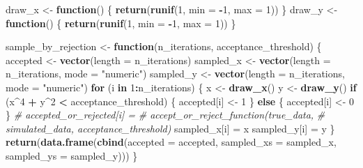 \documentclass[
]{article}
\newenvironment{Shaded}{\begin{snugshade}}{\end{snugshade}}
\newcommand{\AttributeTok}[1]{\textcolor[rgb]{0.13,0.29,0.53}{#1}}
\newcommand{\CommentTok}[1]{\textcolor[rgb]{0.56,0.35,0.01}{\textit{#1}}}
\newcommand{\ControlFlowTok}[1]{\textcolor[rgb]{0.13,0.29,0.53}{\textbf{#1}}}
\newcommand{\DecValTok}[1]{\textcolor[rgb]{0.00,0.00,0.81}{#1}}
\newcommand{\FunctionTok}[1]{\textcolor[rgb]{0.13,0.29,0.53}{\textbf{#1}}}
\newcommand{\NormalTok}[1]{#1}
\newcommand{\OtherTok}[1]{\textcolor[rgb]{0.56,0.35,0.01}{#1}}
\newcommand{\SpecialCharTok}[1]{\textcolor[rgb]{0.81,0.36,0.00}{\textbf{#1}}}
\newcommand{\StringTok}[1]{\textcolor[rgb]{0.31,0.60,0.02}{#1}}
\begin{document}
\begin{Shaded}
\begin{Highlighting}[]
\NormalTok{draw\_x }\OtherTok{\textless{}{-}} \ControlFlowTok{function}\NormalTok{() \{}
    \FunctionTok{return}\NormalTok{(}\FunctionTok{runif}\NormalTok{(}\DecValTok{1}\NormalTok{, }\AttributeTok{min =} \SpecialCharTok{{-}}\DecValTok{1}\NormalTok{, }\AttributeTok{max =} \DecValTok{1}\NormalTok{))}
\NormalTok{\}}
\NormalTok{draw\_y }\OtherTok{\textless{}{-}} \ControlFlowTok{function}\NormalTok{() \{}
    \FunctionTok{return}\NormalTok{(}\FunctionTok{runif}\NormalTok{(}\DecValTok{1}\NormalTok{, }\AttributeTok{min =} \SpecialCharTok{{-}}\DecValTok{1}\NormalTok{, }\AttributeTok{max =} \DecValTok{1}\NormalTok{))}
\NormalTok{\}}

\NormalTok{sample\_by\_rejection }\OtherTok{\textless{}{-}} \ControlFlowTok{function}\NormalTok{(n\_iterations, acceptance\_threshold) \{}
\NormalTok{    accepted }\OtherTok{\textless{}{-}} \FunctionTok{vector}\NormalTok{(}\AttributeTok{length =}\NormalTok{ n\_iterations)}
\NormalTok{    sampled\_x }\OtherTok{\textless{}{-}} \FunctionTok{vector}\NormalTok{(}\AttributeTok{length =}\NormalTok{ n\_iterations, }\AttributeTok{mode =} \StringTok{"numeric"}\NormalTok{)}
\NormalTok{    sampled\_y }\OtherTok{\textless{}{-}} \FunctionTok{vector}\NormalTok{(}\AttributeTok{length =}\NormalTok{ n\_iterations, }\AttributeTok{mode =} \StringTok{"numeric"}\NormalTok{)}
    \ControlFlowTok{for}\NormalTok{ (i }\ControlFlowTok{in} \DecValTok{1}\SpecialCharTok{:}\NormalTok{n\_iterations) \{}
\NormalTok{        x }\OtherTok{\textless{}{-}} \FunctionTok{draw\_x}\NormalTok{()}
\NormalTok{        y }\OtherTok{\textless{}{-}} \FunctionTok{draw\_y}\NormalTok{()}
        \ControlFlowTok{if}\NormalTok{ (x}\SpecialCharTok{\^{}}\DecValTok{4} \SpecialCharTok{+}\NormalTok{ y}\SpecialCharTok{\^{}}\DecValTok{2} \SpecialCharTok{\textless{}}\NormalTok{ acceptance\_threshold) \{}
\NormalTok{            accepted[i] }\OtherTok{\textless{}{-}} \DecValTok{1}
\NormalTok{        \} }\ControlFlowTok{else}\NormalTok{ \{}
\NormalTok{            accepted[i] }\OtherTok{\textless{}{-}} \DecValTok{0}
\NormalTok{        \}}
        \CommentTok{\# accepted\_or\_rejected[i] =}
        \CommentTok{\# accept\_or\_reject\_function(true\_data,}
        \CommentTok{\# simulated\_data, acceptance\_threshold)}
\NormalTok{        sampled\_x[i] }\OtherTok{=}\NormalTok{ x}
\NormalTok{        sampled\_y[i] }\OtherTok{=}\NormalTok{ y}
\NormalTok{    \}}
    \FunctionTok{return}\NormalTok{(}\FunctionTok{data.frame}\NormalTok{(}\FunctionTok{cbind}\NormalTok{(}\AttributeTok{accepted =}\NormalTok{ accepted, }\AttributeTok{sampled\_xs =}\NormalTok{ sampled\_x,}
        \AttributeTok{sampled\_ys =}\NormalTok{ sampled\_y)))}
\NormalTok{\}}


\end{Highlighting}
\end{Shaded}
\end{document}
